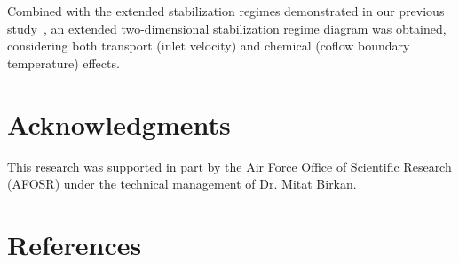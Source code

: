 \documentclass[review,3p,times]{elsarticle}
\begin{document}
Combined with the extended stabilization regimes demonstrated in our previous study~\cite{deng15}, an extended two-dimensional stabilization regime diagram was obtained, considering both transport (inlet velocity) and chemical (coflow boundary temperature) effects.  



\section*{Acknowledgments}
This research was supported in part by the Air Force Office of Scientific Research (AFOSR) under the technical management of Dr. Mitat Birkan.


\section*{References}



\renewcommand{\thefigure}{\arabic{figure}}
\renewcommand{\thetable}{\arabic{table}}
\end{document}
